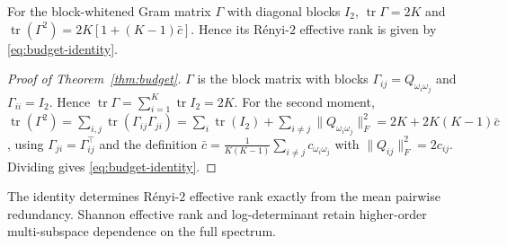 \begin{theorem}
\label{thm:budget}
For the block-whitened Gram matrix $\Gamma$ with diagonal blocks $I_2$,
$\operatorname{tr}\Gamma=2K$ and
$\operatorname{tr}(\Gamma^2)=2K[1+(K-1)\bar c]$. Hence its
R\'enyi-$2$ effective rank is given by \eqref{eq:budget-identity}.
\end{theorem}

\begin{proof}[Proof of Theorem~\ref{thm:budget}]
$\Gamma$ is the block matrix with blocks $\Gamma_{ij}=Q_{\omega_i\omega_j}$ and
$\Gamma_{ii}=I_2$. Hence $\operatorname{tr}\Gamma=\sum_{i=1}^K\operatorname{tr}I_2=2K$.
For the second moment,
$\operatorname{tr}(\Gamma^2)=\sum_{i,j}\operatorname{tr}(\Gamma_{ij}\Gamma_{ji})
=\sum_i\operatorname{tr}(I_2)+\sum_{i\neq j}\|Q_{\omega_i\omega_j}\|_F^2
=2K+2K(K-1)\bar c$, using $\Gamma_{ji}=\Gamma_{ij}^\top$ and the definition
$\bar c=\frac{1}{K(K-1)}\sum_{i\neq j}c_{\omega_i\omega_j}$ with
$\|Q_{ij}\|_F^2=2c_{ij}$. Dividing gives \eqref{eq:budget-identity}.
\end{proof}

The identity determines R\'enyi-$2$ effective rank exactly from the mean pairwise
redundancy. Shannon effective rank and log-determinant retain higher-order
multi-subspace dependence on the full spectrum.

